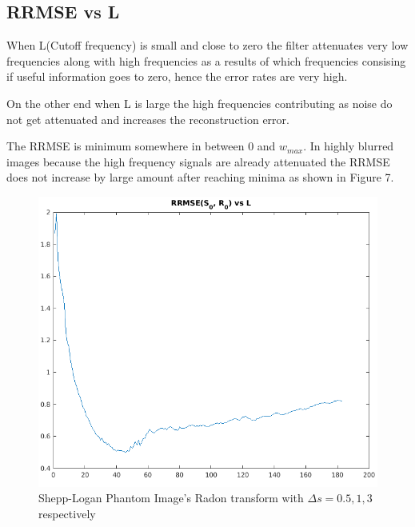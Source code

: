 \documentclass[11pt]{article}
\begin{document}
\FloatBarrier
\subsection{RRMSE vs L}
When L(Cutoff frequency) is small and close to zero the filter attenuates very low frequencies along with high frequencies as a results of which frequencies consising if useful information goes to zero, hence the error rates are very high.

On the other end when L is large the high frequencies contributing as noise do not get attenuated and increases the reconstruction error.

The RRMSE is minimum somewhere in between $0$ and $w_{max}$. In highly blurred images because the high frequency signals are already attenuated the RRMSE does not increase by large amount after reaching minima as shown in Figure 7.
\begin{figure}[!h]
\centering
\includegraphics[scale=0.45]{RRMSE0}
\caption{Shepp-Logan Phantom Image's Radon transform with $\Delta s = 0.5,1,3$ respectively}
\end{figure}
\end{document}
